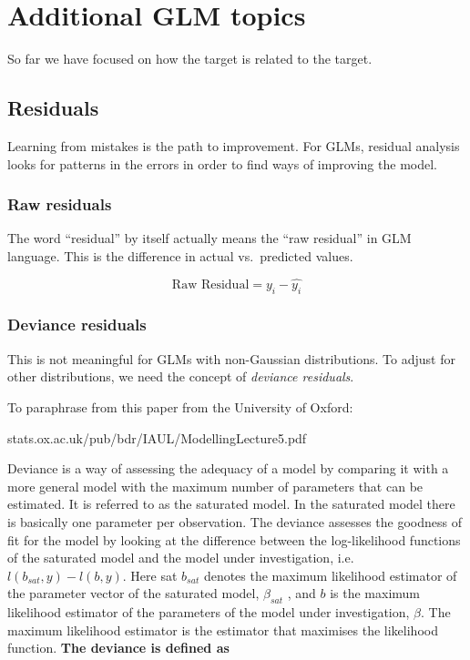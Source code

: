 \documentclass[openany]{book}
\begin{document}
\hypertarget{additional-glm-topics}{%
\chapter{Additional GLM topics}\label{additional-glm-topics}}

So far we have focused on how the target is related to the target.

\hypertarget{residuals}{%
\section{Residuals}\label{residuals}}

Learning from mistakes is the path to improvement. For GLMs, residual analysis looks for patterns in the errors in order to find ways of improving the model.

\hypertarget{raw-residuals}{%
\subsection{Raw residuals}\label{raw-residuals}}

The word ``residual'' by itself actually means the ``raw residual'' in GLM language. This is the difference in actual vs.~predicted values.

\[\text{Raw Residual} = y_i - \hat{y_i}\]

\hypertarget{deviance-residuals}{%
\subsection{Deviance residuals}\label{deviance-residuals}}

This is not meaningful for GLMs with non-Gaussian distributions. To adjust for other distributions, we need the concept of \emph{deviance residuals}.

To paraphrase from this paper from the University of Oxford:

stats.ox.ac.uk/pub/bdr/IAUL/ModellingLecture5.pdf

Deviance is a way of assessing the adequacy of a model by comparing it with a more general
model with the maximum number of parameters that can be estimated. It is referred to
as the saturated model. In the saturated model there is basically one parameter per
observation. The deviance assesses the goodness of fit for the model by looking at the
difference between the log-likelihood functions of the saturated model and the model
under investigation, i.e.~\(l(b_{sat},y) - l(b,y)\). Here sat \(b_{sat}\) denotes the maximum likelihood
estimator of the parameter vector of the saturated model, \(\beta_{sat}\) , and \(b\) is the maximum
likelihood estimator of the parameters of the model under investigation, \(\beta\). The maximum likelihood estimator is the estimator that maximises the likelihood function. \textbf{The deviance is defined as}
\end{document}
